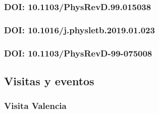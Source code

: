 %   


\subsubsection{DOI: 10.1103/PhysRevD.99.015038 \cite{Bernal:2018aon}} 
\label{sec:physr3}

\begin{includepdfs}
  
\end{includepdfs}



\subsubsection{DOI: 10.1016/j.physletb.2019.01.023 \cite{Reig:2018ztc}}
\label{sec:phyletb1}         

\begin{includepdfs}
  
\end{includepdfs}

\newpage

\subsubsection{DOI: 10.1103/PhysRevD-99-075008 \cite{Calle:2018ovc} }
\label{sec:physr4}         

\begin{includepdfs}
  
\end{includepdfs}


\subsection{Visitas y eventos}
\label{sec:visitas-y-eventos}


\subsubsection{Visita Valencia} 
\label{sec:visita-valencia}

\begin{includepdfs}
  
\end{includepdfs}

